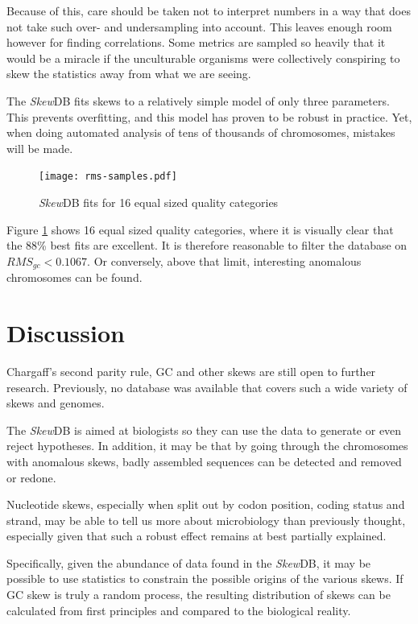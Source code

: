\documentclass[9pt,twocolumn,twoside]{pnas-new}
\begin{document}
Because of this, care should be taken not to interpret numbers in a way that does not take such over- and undersampling into account. This leaves enough room however for finding correlations. Some metrics are sampled so heavily that it would be a miracle if the unculturable organisms were collectively conspiring to skew the statistics away from what we are seeing.

The \emph{Skew}DB fits skews to a relatively simple model of only three parameters. This prevents overfitting, and this model has proven to be robust in practice. Yet, when doing automated analysis of tens of thousands of chromosomes, mistakes will be made. 

\begin{figure}[tbhp]
\centering
\texttt{[image: rms-samples.pdf]}
\caption{\emph{Skew}DB fits for 16 equal sized quality categories}
\label{fig:rms-samples}
\end{figure}

Figure \ref{fig:rms-samples} shows 16 equal sized quality categories, where it is visually clear that the 88\% best fits are excellent. It is therefore reasonable to filter the database on $RMS_{gc}<0.1067$. Or conversely, above that limit, interesting anomalous chromosomes can be found.

\section*{Discussion}
Chargaff's second parity rule, GC and other skews are still open to further research. Previously, no database was available that covers such a wide variety of skews and genomes.

The \emph{Skew}DB is aimed at biologists so they can use the data to generate or even reject hypotheses. In addition, it may be that by going through the chromosomes with anomalous skews, badly assembled sequences can be detected and removed or redone.

Nucleotide skews, especially when split out by codon position, coding status and strand, may be able to tell us more about microbiology than previously thought, especially given that such a robust effect remains at best partially explained.

Specifically, given the abundance of data found in the \emph{Skew}DB, it may be possible to use statistics to constrain the possible origins of the various skews. If GC skew is truly a random process, the resulting distribution of skews can be calculated from first principles and compared to the biological reality.
\end{document}
